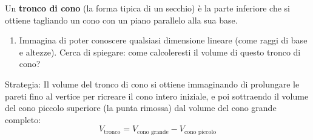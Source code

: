 Un \textbf{tronco di cono} (la forma tipica di un secchio) è la parte inferiore che si ottiene tagliando un cono con un piano parallelo alla sua base.

\begin{center}
\end{center}

\begin{enumerate}[label=\alph*)]
  \item Immagina di poter conoscere qualsiasi dimensione lineare (come raggi di base e altezze). Cerca di spiegare: come calcoleresti il volume di questo tronco di cono?
\end{enumerate}

\responsespace{3.5cm}

\begin{soluzione}
  Strategia:
  Il volume del tronco di cono si ottiene immaginando di prolungare le pareti fino al vertice per ricreare il cono intero iniziale, e poi sottraendo il volume del cono piccolo superiore (la punta rimossa) dal volume del cono grande completo:
  \[
  V_{\text{tronco}} = V_{\text{cono grande}} - V_{\text{cono piccolo}}
  \]
\end{soluzione}

\condnewpage

